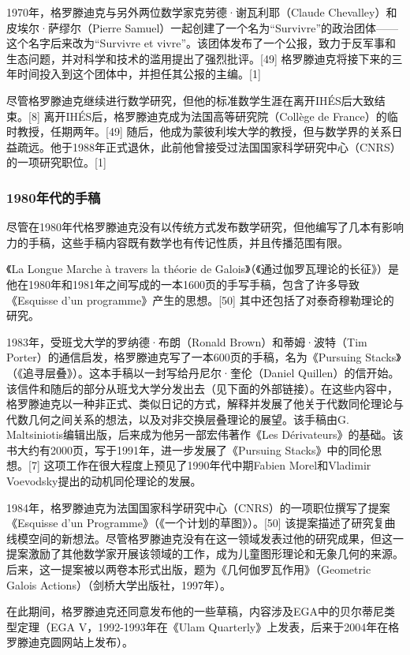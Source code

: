 1970年，格罗滕迪克与另外两位数学家克劳德·谢瓦利耶（Claude Chevalley）和皮埃尔·萨缪尔（Pierre Samuel）一起创建了一个名为“Survivre”的政治团体——这个名字后来改为“Survivre et vivre”。该团体发布了一个公报，致力于反军事和生态问题，并对科学和技术的滥用提出了强烈批评。[49] 格罗滕迪克将接下来的三年时间投入到这个团体中，并担任其公报的主编。[1]

尽管格罗滕迪克继续进行数学研究，但他的标准数学生涯在离开IHÉS后大致结束。[8] 离开IHÉS后，格罗滕迪克成为法国高等研究院（Collège de France）的临时教授，任期两年。[49] 随后，他成为蒙彼利埃大学的教授，但与数学界的关系日益疏远。他于1988年正式退休，此前他曾接受过法国国家科学研究中心（CNRS）的一项研究职位。[1]
\subsubsection{1980年代的手稿}  
尽管在1980年代格罗滕迪克没有以传统方式发布数学研究，但他编写了几本有影响力的手稿，这些手稿内容既有数学也有传记性质，并且传播范围有限。

《La Longue Marche à travers la théorie de Galois》（《通过伽罗瓦理论的长征》）是他在1980年和1981年之间写成的一本1600页的手写手稿，包含了许多导致《Esquisse d'un programme》产生的思想。[50] 其中还包括了对泰奇穆勒理论的研究。

1983年，受班戈大学的罗纳德·布朗（Ronald Brown）和蒂姆·波特（Tim Porter）的通信启发，格罗滕迪克写了一本600页的手稿，名为《Pursuing Stacks》（《追寻层叠》）。这本手稿以一封写给丹尼尔·奎伦（Daniel Quillen）的信开始。该信件和随后的部分从班戈大学分发出去（见下面的外部链接）。在这些内容中，格罗滕迪克以一种非正式、类似日记的方式，解释并发展了他关于代数同伦理论与代数几何之间关系的想法，以及对非交换层叠理论的展望。该手稿由G. Maltsiniotis编辑出版，后来成为他另一部宏伟著作《Les Dérivateurs》的基础。该书大约有2000页，写于1991年，进一步发展了《Pursuing Stacks》中的同伦思想。[7] 这项工作在很大程度上预见了1990年代中期Fabien Morel和Vladimir Voevodsky提出的动机同伦理论的发展。

1984年，格罗滕迪克为法国国家科学研究中心（CNRS）的一项职位撰写了提案《Esquisse d'un Programme》（《一个计划的草图》）。[50] 该提案描述了研究复曲线模空间的新想法。尽管格罗滕迪克没有在这一领域发表过他的研究成果，但这一提案激励了其他数学家开展该领域的工作，成为儿童图形理论和无象几何的来源。后来，这一提案被以两卷本形式出版，题为《几何伽罗瓦作用》（Geometric Galois Actions）（剑桥大学出版社，1997年）。

在此期间，格罗滕迪克还同意发布他的一些草稿，内容涉及EGA中的贝尔蒂尼类型定理（EGA V，1992-1993年在《Ulam Quarterly》上发表，后来于2004年在格罗滕迪克圆网站上发布）。

